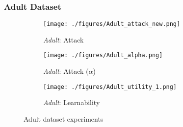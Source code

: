 \subsubsection{Adult Dataset}
\label{app:adult experiments}
\begin{figure*}[ht]
    \begin{subfigure}[b]{0.32\linewidth}\centering
        \texttt{[image: ./figures/Adult\_attack\_new.png]}
        \caption{\textit{Adult}: Attack }%
        \label{fig:Adult:attack}
    \end{subfigure}
    \begin{subfigure}[b]{0.32\linewidth}\centering
    \texttt{[image: ./figures/Adult\_alpha.png]}
        \caption{\textit{Adult}: Attack ($\alpha$)}
        \label{fig:Adult:alpha}
    \end{subfigure}
    \begin{subfigure}[b]{0.32\linewidth}\centering
   \texttt{[image: ./figures/Adult\_utility\_1.png]}
        \caption{\textit{Adult}: Learnability}
        \label{fig:Adult:utility}
    \end{subfigure}
        \caption{Adult dataset experiments}
        \label{fig: adult experiments}
\end{figure*}






